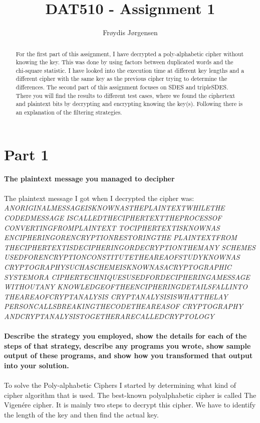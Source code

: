 \documentclass[12pt, letterpaper]{article}
\title{DAT510 - Assignment 1}
\author{Fr\o ydis J\o rgensen}
\begin{document}
\begin{titlepage}
\maketitle
\end{titlepage}


\begin{abstract}
For the first part of this assignment, I have decrypted a poly-alphabetic cipher without knowing the key. This was done by using factors between duplicated words and the chi-square statistic. I have looked into the execution time at different key lengths and a different cipher with the same key as the previous cipher trying to determine the differences. The second part of this assignment focuses on SDES and tripleSDES. There you will find the results to different test cases, where we found the ciphertext and plaintext bits by decrypting and encrypting knowing the key(s). Following there is an explanation of the filtering strategies.
\end{abstract}

\section*{Part 1}
\textbf{The plaintext message you managed to decipher} \\
\\
The plaintext message I got when I decrypted the cipher was:\\
\textit{
ANORIGINALMESSAGEISKNOWNASTHEPLAINTEXTWHILETHE\\CODEDMESSAGE
ISCALLEDTHECIPHERTEXTTHEPROCESSOF\\CONVERTINGFROMPLAINTEXT
TOCIPHERTEXTISKNOWNAS\\ENCIPHERINGORENCRYPTIONRESTORINGTHE
PLAINTEXTFROM\\THECIPHERTEXTISDECIPHERINGORDECRYPTIONTHEMANY
SCHEMES\\USEDFORENCRYPTIONCONSTITUTETHEAREAOFSTUDYKNOWNAS
CRYPTOGRAPHYSUCHASCHEMEISKNOWNASACRYPTOGRAPHIC\\SYSTEMORA
CIPHERTECHNIQUESUSEDFORDECIPHERINGAMESSAGE\\WITHOUTANY
KNOWLEDGEOFTHEENCIPHERINGDETAILSFALLINTO\\THEAREAOFCRYPTANALYSIS
CRYPTANALYSISISWHATTHELAY\\PERSONCALLSBREAKINGTHECODETHEAREASOF
CRYPTOGRAPHY\\ANDCRYPTANALYSISTOGETHERARECALLEDCRYPTOLOGY}\\
\\
\textbf{Describe the strategy you employed, show the details for each of the steps of that strategy, describe any programs you wrote, show sample output of these programs, and show how you transformed that output into your solution.} \\
\\
To solve the Poly-alphabetic Ciphers I started by determining what kind of cipher algorithm that is used.
The best-known polyalphabetic cipher is called The Vigenére cipher. It is mainly two steps to decrypt this cipher.
We have to identify the length of the key and then find the actual key. \cite{vigenere}
\end{document}
